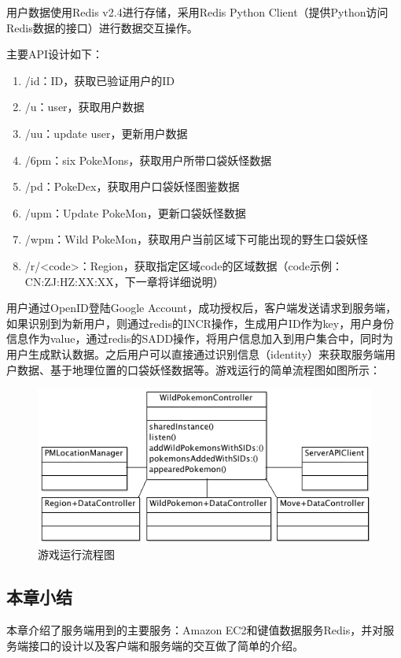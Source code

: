 \documentclass{article}
\begin{document}
\begin{CJK}{UTF8}{gbsn}
  用户数据使用Redis v2.4进行存储，采用Redis Python Client（提供Python访问Redis数据的接口）进行数据交互操作。

  主要API设计如下：

  \begin{enumerate}
		\item /id：ID，获取已验证用户的ID
		\item /u：user，获取用户数据
		\item /uu：update user，更新用户数据
		\item /6pm：six PokeMons，获取用户所带口袋妖怪数据
		\item /pd：PokeDex，获取用户口袋妖怪图鉴数据
		\item /upm：Update PokeMon，更新口袋妖怪数据
		\item /wpm：Wild PokeMon，获取用户当前区域下可能出现的野生口袋妖怪
		\item /r/<code>：Region，获取指定区域code的区域数据（code示例：CN:ZJ:HZ:XX:XX，下一章将详细说明）
  \end{enumerate}

  用户通过OpenID登陆Google Account，成功授权后，客户端发送请求到服务端，如果识别到为新用户，则通过redis的INCR操作，生成用户ID作为key，用户身份信息作为value，通过redis的SADD操作，将用户信息加入到用户集合中，同时为用户生成默认数据。之后用户可以直接通过识别信息（identity）来获取服务端用户数据、基于地理位置的口袋妖怪数据等。游戏运行的简单流程图如图所示：

  \begin{figure}[htbp]
		\centering
		\includegraphics[bb=0 0 548 341, scale=0.45]{figure/fig_n18.png}
		\caption{游戏运行流程图}
		\label{fig:n18}
	\end{figure}

	\subsection{本章小结}
  本章介绍了服务端用到的主要服务：Amazon EC2和键值数据服务Redis，并对服务端接口的设计以及客户端和服务端的交互做了简单的介绍。



\end{CJK}
\end{document}
